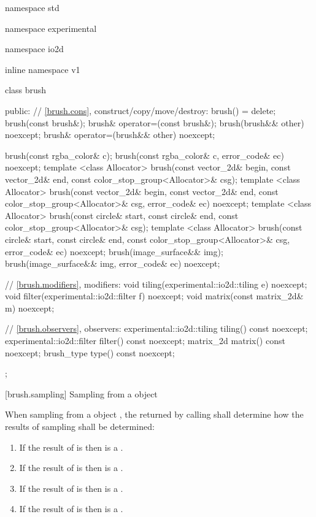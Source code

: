 \begin{codeblock}
namespace std { namespace experimental { namespace io2d { inline namespace v1 {
  class brush {
  public:
    // \ref{brush.cons}, construct/copy/move/destroy:
    brush() = delete;
    brush(const brush&);
    brush& operator=(const brush&);
    brush(brush&& other) noexcept;
    brush& operator=(brush&& other) noexcept;
    
    brush(const rgba_color& c);
    brush(const rgba_color& c, error_code& ec) noexcept;
    template <class Allocator>
    brush(const vector_2d& begin, const vector_2d& end,
      const color_stop_group<Allocator>& csg);
    template <class Allocator>
    brush(const vector_2d& begin, const vector_2d& end,
      const color_stop_group<Allocator>& csg, error_code& ec) noexcept;
    template <class Allocator>
    brush(const circle& start, const circle& end,
      const color_stop_group<Allocator>& csg);
    template <class Allocator>
    brush(const circle& start, const circle& end,
      const color_stop_group<Allocator>& csg, error_code& ec) noexcept;
    brush(image_surface&& img);
    brush(image_surface&& img, error_code& ec) noexcept;

    // \ref{brush.modifiers}, modifiers:
    void tiling(experimental::io2d::tiling e) noexcept;
    void filter(experimental::io2d::filter f) noexcept;
    void matrix(const matrix_2d& m) noexcept;

    // \ref{brush.observers}, observers:
    experimental::io2d::tiling tiling() const noexcept;
    experimental::io2d::filter filter() const noexcept;
    matrix_2d matrix() const noexcept;
    brush_type type() const noexcept;
  };
} } } }
\end{codeblock}

 [brush.sampling] {Sampling from a  object}

\pnum
When sampling from a  object , the  returned by calling  shall determine how the results of sampling shall be determined:
\begin{enumerate}
\item If the result of  is  then  is a .
\item If the result of  is  then  is a .
\item If the result of  is  then  is a .
\item If the result of  is  then  is a .
\end{enumerate}


